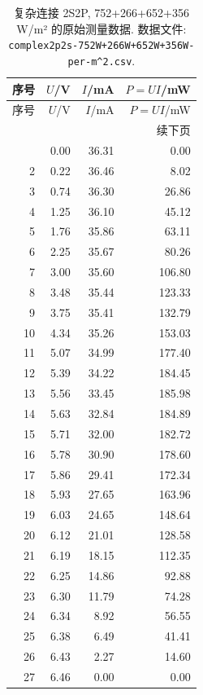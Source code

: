 \documentclass[UTF8,a4paper,11pt]{ctexart}
\begin{document}
\begin{longtable}{rrrr}
\caption{复杂连接 2S2P, 752+266+652+356 W/m² 的原始测量数据. 数据文件: \texttt{complex2p2s-752W+266W+652W+356W-per-m\textasciicircum{}2.csv}.}\\
\toprule
序号 & $U$/V & $I$/mA & $P=UI$/mW \\
\midrule
\endfirsthead
\toprule
序号 & $U$/V & $I$/mA & $P=UI$/mW \\
\midrule
\endhead
\midrule
\multicolumn{4}{r}{续下页} \\
\endfoot
\bottomrule
\endlastfoot
1 & 0.00 & 36.31 & 0.00 \\
2 & 0.22 & 36.46 & 8.02 \\
3 & 0.74 & 36.30 & 26.86 \\
4 & 1.25 & 36.10 & 45.12 \\
5 & 1.76 & 35.86 & 63.11 \\
6 & 2.25 & 35.67 & 80.26 \\
7 & 3.00 & 35.60 & 106.80 \\
8 & 3.48 & 35.44 & 123.33 \\
9 & 3.75 & 35.41 & 132.79 \\
10 & 4.34 & 35.26 & 153.03 \\
11 & 5.07 & 34.99 & 177.40 \\
12 & 5.39 & 34.22 & 184.45 \\
13 & 5.56 & 33.45 & 185.98 \\
14 & 5.63 & 32.84 & 184.89 \\
15 & 5.71 & 32.00 & 182.72 \\
16 & 5.78 & 30.90 & 178.60 \\
17 & 5.86 & 29.41 & 172.34 \\
18 & 5.93 & 27.65 & 163.96 \\
19 & 6.03 & 24.65 & 148.64 \\
20 & 6.12 & 21.01 & 128.58 \\
21 & 6.19 & 18.15 & 112.35 \\
22 & 6.25 & 14.86 & 92.88 \\
23 & 6.30 & 11.79 & 74.28 \\
24 & 6.34 & 8.92 & 56.55 \\
25 & 6.38 & 6.49 & 41.41 \\
26 & 6.43 & 2.27 & 14.60 \\
27 & 6.46 & 0.00 & 0.00 \\
\end{longtable}
\newpage
\end{document}
